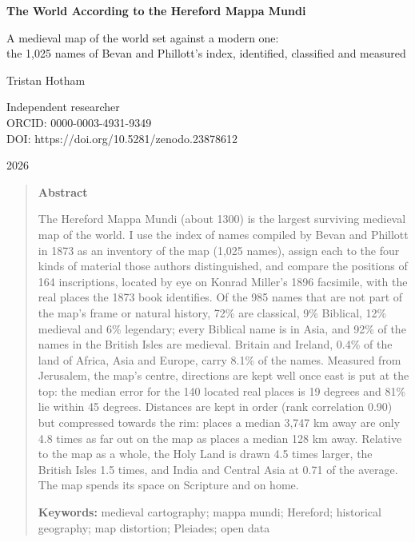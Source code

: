 \documentclass[11pt,a4paper]{article}
\begin{document}
\begin{center}
{\Large\bfseries The World According to the Hereford Mappa Mundi\par}
\vspace{0.4em}
{\large A medieval map of the world set against a modern one:\\the 1,025 names of Bevan and Phillott's index, identified, classified and measured\par}
\vspace{1.2em}
{\large Tristan Hotham\par}
\vspace{0.3em}
{\small Independent researcher\\
ORCID: 0000-0003-4931-9349\\
DOI: https://doi.org/10.5281/zenodo.23878612\par}
\vspace{0.8em}
2026
\end{center}

\begin{quote}
\small
\begin{center}\textbf{Abstract}\end{center}
The Hereford Mappa Mundi (about 1300) is the largest surviving medieval map of the world. I use the index of names compiled by Bevan and Phillott in 1873 as an inventory of the map (1,025 names), assign each to the four kinds of material those authors distinguished, and compare the positions of 164 inscriptions, located by eye on Konrad Miller's 1896 facsimile, with the real places the 1873 book identifies. Of the 985 names that are not part of the map's frame or natural history, 72\% are classical, 9\% Biblical, 12\% medieval and 6\% legendary; every Biblical name is in Asia, and 92\% of the names in the British Isles are medieval. Britain and Ireland, 0.4\% of the land of Africa, Asia and Europe, carry 8.1\% of the names. Measured from Jerusalem, the map's centre, directions are kept well once east is put at the top: the median error for the 140 located real places is 19 degrees and 81\% lie within 45 degrees. Distances are kept in order (rank correlation 0.90) but compressed towards the rim: places a median 3,747 km away are only 4.8 times as far out on the map as places a median 128 km away. Relative to the map as a whole, the Holy Land is drawn 4.5 times larger, the British Isles 1.5 times, and India and Central Asia at 0.71 of the average. The map spends its space on Scripture and on home.

\textbf{Keywords:} medieval cartography; mappa mundi; Hereford; historical geography; map distortion; Pleiades; open data
\end{quote}
\end{document}
